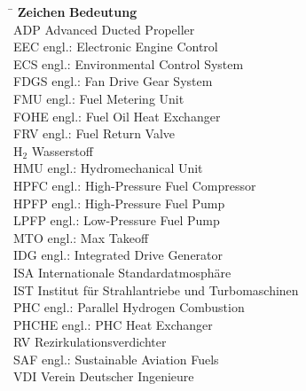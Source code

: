 \begin{tabbing}
	\hspace*{3cm} \= \hspace*{8cm} \kill
	\textbf{Zeichen} \> \textbf{Bedeutung} 							\\[5mm]
    ADP     \>  Advanced Ducted Propeller                           \\
    EEC     \>  engl.: Electronic Engine Control                    \\
    ECS     \>  engl.: Environmental Control System                 \\
    FDGS    \>  engl.: Fan Drive Gear System                        \\
    FMU     \>  engl.: Fuel Metering Unit                           \\
    FOHE    \>  engl.: Fuel Oil Heat Exchanger                      \\
    FRV     \>  engl.: Fuel Return Valve                            \\
    H$_2$ 	\> 	Wasserstoff 										\\
    HMU     \>  engl.: Hydromechanical Unit                         \\
    HPFC    \>  engl.: High-Pressure Fuel Compressor                \\
    HPFP    \>  engl.: High-Pressure Fuel Pump                      \\
    LPFP    \>  engl.: Low-Pressure Fuel Pump                       \\
    MTO     \>  engl.: Max Takeoff                                  \\
    IDG     \>  engl.: Integrated Drive Generator                   \\
    ISA     \>  Internationale Standardatmosphäre                   \\
	IST		\> 	Institut für Strahlantriebe und Turbomaschinen		\\
    PHC     \>  engl.: Parallel Hydrogen Combustion                 \\
    PHCHE   \>  engl.: PHC Heat Exchanger                           \\
    RV      \>  Rezirkulationsverdichter                            \\
    SAF 	\> 	engl.: Sustainable Aviation Fuels 					\\
	VDI		\>	Verein Deutscher Ingenieure							\\

\end{tabbing}